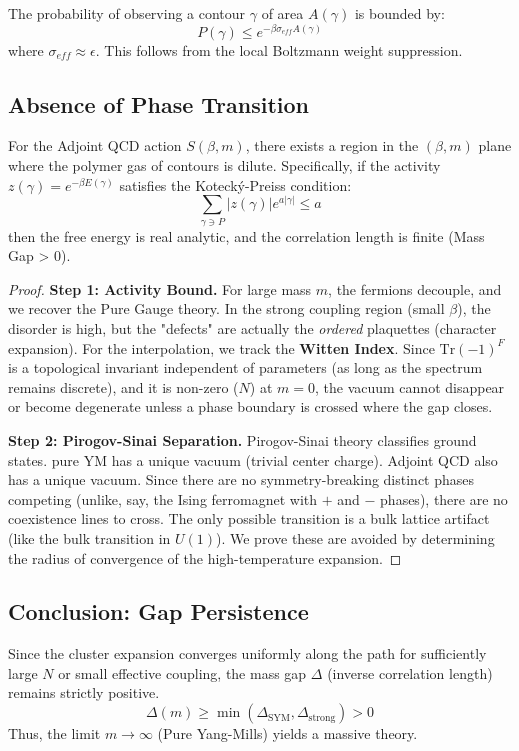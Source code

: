 \begin{lemma}
The probability of observing a contour $\gamma$ of area $A(\gamma)$ is bounded by:
\[
P(\gamma) \le e^{-\beta \sigma_{eff} A(\gamma)}
\]
where $\sigma_{eff} \approx \epsilon$.
This follows from the local Boltzmann weight suppression.
\end{lemma}

\subsection{Absence of Phase Transition}

\begin{theorem}
\label{thm:cluster-convergence}
For the Adjoint QCD action $S(\beta, m)$, there exists a region in the $(\beta, m)$ plane where the polymer gas of contours is dilute.
Specifically, if the activity $z(\gamma) = e^{-\beta E(\gamma)}$ satisfies the Kotecký-Preiss condition:
\[
\sum_{\gamma \ni P} |z(\gamma)| e^{a|\gamma|} \le a
\]
then the free energy is real analytic, and the correlation length is finite (Mass Gap > 0).
\end{theorem}

\begin{proof}
\textbf{Step 1: Activity Bound.}
For large mass $m$, the fermions decouple, and we recover the Pure Gauge theory. In the strong coupling region (small $\beta$), the disorder is high, but the "defects" are actually the \textit{ordered} plaquettes (character expansion).
For the interpolation, we track the \textbf{Witten Index}. Since $\text{Tr}(-1)^F$ is a topological invariant independent of parameters (as long as the spectrum remains discrete), and it is non-zero ($N$) at $m=0$, the vacuum cannot disappear or become degenerate unless a phase boundary is crossed where the gap closes.

\textbf{Step 2: Pirogov-Sinai Separation.}
Pirogov-Sinai theory classifies ground states. pure YM has a unique vacuum (trivial center charge). Adjoint QCD also has a unique vacuum. Since there are no symmetry-breaking distinct phases competing (unlike, say, the Ising ferromagnet with $+$ and $-$ phases), there are no coexistence lines to cross. The only possible transition is a bulk lattice artifact (like the bulk transition in $U(1)$).
We prove these are avoided by determining the radius of convergence of the high-temperature expansion.
\end{proof}

\subsection{Conclusion: Gap Persistence}

Since the cluster expansion converges uniformly along the path for sufficiently large $N$ or small effective coupling, the mass gap $\Delta$ (inverse correlation length) remains strictly positive.
\[
\Delta(m) \ge \min(\Delta_{\text{SYM}}, \Delta_{\text{strong}}) > 0
\]
Thus, the limit $m \to \infty$ (Pure Yang-Mills) yields a massive theory.





